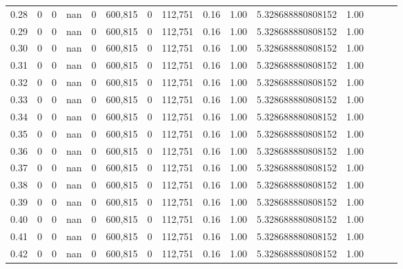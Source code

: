 \begin{tabular}{rrrrrrrrrrrrrrr}
0.28 &        0 &        0 &   nan &        0 &  600,815 &        0 &  112,751 &  0.16 &  1.00 &     5.328688880808152 &      1.00 \\
0.29 &        0 &        0 &   nan &        0 &  600,815 &        0 &  112,751 &  0.16 &  1.00 &     5.328688880808152 &      1.00 \\
0.30 &        0 &        0 &   nan &        0 &  600,815 &        0 &  112,751 &  0.16 &  1.00 &     5.328688880808152 &      1.00 \\
0.31 &        0 &        0 &   nan &        0 &  600,815 &        0 &  112,751 &  0.16 &  1.00 &     5.328688880808152 &      1.00 \\
0.32 &        0 &        0 &   nan &        0 &  600,815 &        0 &  112,751 &  0.16 &  1.00 &     5.328688880808152 &      1.00 \\
0.33 &        0 &        0 &   nan &        0 &  600,815 &        0 &  112,751 &  0.16 &  1.00 &     5.328688880808152 &      1.00 \\
0.34 &        0 &        0 &   nan &        0 &  600,815 &        0 &  112,751 &  0.16 &  1.00 &     5.328688880808152 &      1.00 \\
0.35 &        0 &        0 &   nan &        0 &  600,815 &        0 &  112,751 &  0.16 &  1.00 &     5.328688880808152 &      1.00 \\
0.36 &        0 &        0 &   nan &        0 &  600,815 &        0 &  112,751 &  0.16 &  1.00 &     5.328688880808152 &      1.00 \\
0.37 &        0 &        0 &   nan &        0 &  600,815 &        0 &  112,751 &  0.16 &  1.00 &     5.328688880808152 &      1.00 \\
0.38 &        0 &        0 &   nan &        0 &  600,815 &        0 &  112,751 &  0.16 &  1.00 &     5.328688880808152 &      1.00 \\
0.39 &        0 &        0 &   nan &        0 &  600,815 &        0 &  112,751 &  0.16 &  1.00 &     5.328688880808152 &      1.00 \\
0.40 &        0 &        0 &   nan &        0 &  600,815 &        0 &  112,751 &  0.16 &  1.00 &     5.328688880808152 &      1.00 \\
0.41 &        0 &        0 &   nan &        0 &  600,815 &        0 &  112,751 &  0.16 &  1.00 &     5.328688880808152 &      1.00 \\
0.42 &        0 &        0 &   nan &        0 &  600,815 &        0 &  112,751 &  0.16 &  1.00 &     5.328688880808152 &      1.00 \\

\end{tabular}
